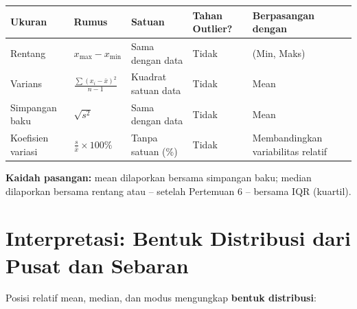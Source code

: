 \documentclass[
  indonesian,
  letterpaper,
]{book}
\newcounter{none} %
\begin{document}
{\def\LTcaptype{none} %
\begin{longtable}[]{@{}
  >{\raggedright\arraybackslash}p{}
  >{\raggedright\arraybackslash}p{}
  >{\raggedright\arraybackslash}p{}
  >{\raggedright\arraybackslash}p{}
  >{\raggedright\arraybackslash}p{}@{}}
\toprule\noalign{}
\begin{minipage}[b]{\linewidth}\raggedright
Ukuran
\end{minipage} & \begin{minipage}[b]{\linewidth}\raggedright
Rumus
\end{minipage} & \begin{minipage}[b]{\linewidth}\raggedright
Satuan
\end{minipage} & \begin{minipage}[b]{\linewidth}\raggedright
Tahan Outlier?
\end{minipage} & \begin{minipage}[b]{\linewidth}\raggedright
Berpasangan dengan
\end{minipage} \\
\midrule\noalign{}
\endhead
\bottomrule\noalign{}
\endlastfoot
Rentang & \(x_{\text{max}} - x_{\text{min}}\) & Sama dengan data & Tidak
& (Min, Maks) \\
Varians & \(\frac{\sum (x_i - \bar{x})^2}{n-1}\) & Kuadrat satuan data &
Tidak & Mean \\
Simpangan baku & \(\sqrt{s^2}\) & Sama dengan data & Tidak & Mean \\
Koefisien variasi & \(\frac{s}{\bar{x}} \times 100\%\) & Tanpa satuan
(\%) & Tidak & Membandingkan variabilitas relatif \\
\end{longtable}
}

\textbf{Kaidah pasangan:} mean dilaporkan bersama simpangan baku; median
dilaporkan bersama rentang atau -- setelah Pertemuan 6 -- bersama IQR
(kuartil).

\section{Interpretasi: Bentuk Distribusi dari Pusat dan
Sebaran}\label{interpretasi-bentuk-distribusi-dari-pusat-dan-sebaran}

Posisi relatif mean, median, dan modus mengungkap \textbf{bentuk
distribusi}:
\end{document}
